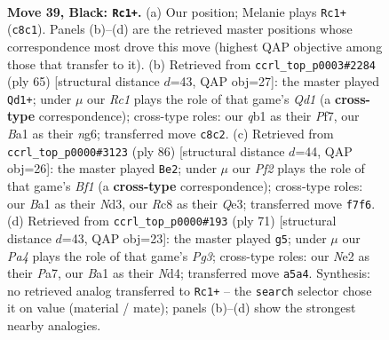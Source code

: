 \documentclass[11pt]{article}
\begin{document}
\clearpage

\begin{figure}[p]\centering
\begin{subfigure}{0.46\textwidth}\centering
\resizebox{\linewidth}{!}{%
\newchessgame
\chessboard[
  setfen={2r3k1/1p3p2/6p1/p7/7p/7P/P2NnqP1/bQ5K b - - 1 39},
  showmover=false,
  pgfstyle=straightmove, color=movearrow, markmove={c8-c1}
]}
\caption{}
\end{subfigure}\hfill
\begin{subfigure}{0.46\textwidth}\centering
\resizebox{\linewidth}{!}{%
\newchessgame
\chessboard[
  setfen={3q2k1/1pp2p2/6Np/P7/4Q1nP/P5P1/5P2/6K1 b - - 0 33},
  showmover=false,
  pgfstyle=straightmove, color=movearrow, markmove={d8-d1}
]}
\caption{}
\end{subfigure}
\\[4pt]
\begin{subfigure}{0.46\textwidth}\centering
\resizebox{\linewidth}{!}{%
\newchessgame
\chessboard[
  setfen={5nk1/8/bpp5/p5P1/2q3P1/3NQ3/PP6/5BK1 w - - 1 44},
  showmover=false,
  pgfstyle=straightmove, color=movearrow, markmove={f1-e2}
]}
\caption{}
\end{subfigure}\hfill
\begin{subfigure}{0.46\textwidth}\centering
\resizebox{\linewidth}{!}{%
\newchessgame
\chessboard[
  setfen={8/pp4k1/6pp/4qp2/3n4/1PNQ1PP1/P6P/5K2 b - - 3 36},
  showmover=false,
  pgfstyle=straightmove, color=movearrow, markmove={g6-g5}
]}
\caption{}
\end{subfigure}
\caption{\textbf{Move 39, Black: \texttt{Rc1+}.} (a) Our position; Melanie plays \texttt{Rc1+} (\texttt{c8c1}). Panels (b)--(d) are the retrieved master positions whose correspondence most drove this move (highest QAP objective among those that transfer to it). (b) Retrieved from \texttt{ccrl\_top\_p0003\#2284} (ply 65) [structural distance $d$=43, QAP obj=27]: the master played \texttt{Qd1+}; under $\mu$ our \emph{Rc1} plays the role of that game's \emph{Qd1} (a \textbf{cross-type} correspondence); cross-type roles: our \emph{q}b1 as their \emph{P}f7, our \emph{B}a1 as their \emph{n}g6; transferred move \texttt{c8c2}. (c) Retrieved from \texttt{ccrl\_top\_p0000\#3123} (ply 86) [structural distance $d$=44, QAP obj=26]: the master played \texttt{Be2}; under $\mu$ our \emph{Pf2} plays the role of that game's \emph{Bf1} (a \textbf{cross-type} correspondence); cross-type roles: our \emph{B}a1 as their \emph{N}d3, our \emph{R}c8 as their \emph{Q}e3; transferred move \texttt{f7f6}. (d) Retrieved from \texttt{ccrl\_top\_p0000\#193} (ply 71) [structural distance $d$=43, QAP obj=23]: the master played \texttt{g5}; under $\mu$ our \emph{Pa4} plays the role of that game's \emph{Pg3}; cross-type roles: our \emph{N}e2 as their \emph{P}a7, our \emph{B}a1 as their \emph{N}d4; transferred move \texttt{a5a4}. Synthesis: no retrieved analog transferred to \texttt{Rc1+} -- the \texttt{search} selector chose it on value (material / mate); panels (b)--(d) show the strongest nearby analogies.}
\label{fig:thought-m77}
\end{figure}
\end{document}
